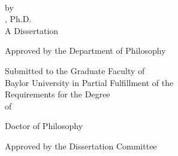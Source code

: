 \documentclass[12pt]{report}
\begin{document}
\thispagestyle{empty}
\begin{center}
    \begin{singlespacing}
    \mytitle{}\\            %
    \end{singlespacing}

    by\\

    \myname{}, Ph.D.\\ %

    A Dissertation

    Approved by the Department of Philosophy


\begin{singlespacing}
    Submitted to the Graduate Faculty of\\

    Baylor University in Partial Fulfillment of the\\

    Requirements for the Degree\\

    of\\

\end{singlespacing}

    Doctor of Philosophy\\ %
\end{center}

\vspace{0.25in} %

\begin{minipage}{3.625in}
\begin{center}
Approved by the Dissertation Committee


\vspace{-.175in}


\vspace{-.175in}


\vspace{-.175in}


\vspace{-.175in}

{\color{white} } %
\end{center}
\end{minipage}
\end{document}
